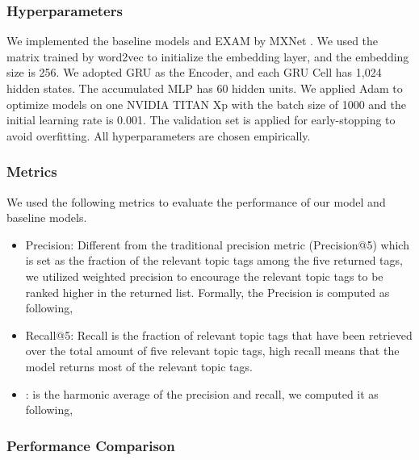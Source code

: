 \documentclass[letterpaper]{article} \usepackage{aaai19}  \usepackage{times}  \usepackage{helvet}  \usepackage{courier}  \usepackage{url}  \usepackage{graphicx}
\begin{document}
\subsubsection{Hyperparameters}
We implemented the baseline models and EXAM by MXNet \cite{MXNet}. We used the matrix trained by word2vec \cite{Word2vec} to initialize the embedding layer, and the embedding size is 256. We adopted GRU as the Encoder, and each GRU Cell has 1,024 hidden states. The accumulated MLP has 60 hidden units. We applied Adam \cite{adam} to optimize models on one NVIDIA TITAN Xp with the batch size of 1000 and the initial learning rate is 0.001. The validation set is applied for early-stopping to avoid overfitting. All hyperparameters are chosen empirically.
\subsubsection{Metrics}
We used the following metrics to evaluate the performance of our model and baseline models.


\begin{itemize}
\item Precision: Different from the traditional precision metric (Precision@5) which is set as the fraction of the relevant topic tags among the five returned tags, we utilized weighted precision to encourage the relevant topic tags to be ranked higher in the returned list. Formally, the Precision is computed as following,

\item Recall@5: Recall is the fraction of relevant topic tags that have been retrieved over the total amount of five relevant topic tags,  high recall means that the model returns most of the relevant topic tags. 
\item :  is the harmonic average of the precision and recall, we computed it as following,

\end{itemize}

\subsubsection{Performance Comparison}
\end{document}
